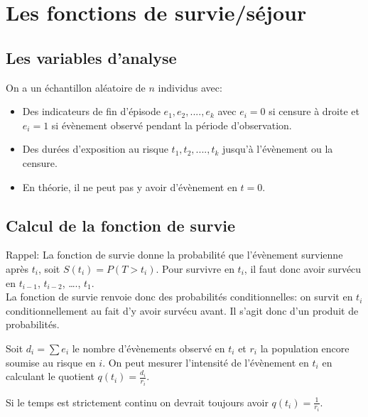 \documentclass[
  12pt,
  letterpaper,
  DIV=11,
  numbers=noendperiod,
  onepage,
  openany]{scrreprt}
\providecommand{\tightlist}{%
  \setlength{\itemsep}{0pt}\setlength{\parskip}{0pt}}\usepackage{longtable,booktabs,array}
\begin{document}
\hypertarget{les-fonctions-de-surviesuxe9jour}{%
\section{\texorpdfstring{\textbf{Les fonctions de
survie/séjour}}{Les fonctions de survie/séjour}}\label{les-fonctions-de-surviesuxe9jour}}

\hypertarget{les-variables-danalyse}{%
\subsection{Les variables d'analyse}\label{les-variables-danalyse}}

On a un échantillon aléatoire de \(n\) individus avec:

\begin{itemize}
\tightlist
\item
  Des indicateurs de fin d'épisode \(e_1,e_2,....,e_k\) avec \(e_i=0\)
  si censure à droite et \(e_i=1\) si évènement observé pendant la
  période d'observation.
\item
  Des durées d'exposition au risque \(t_1,t_2,....,t_k\) jusqu'à
  l'évènement ou la censure.
\item
  En théorie, il ne peut pas y avoir d'évènement en \(t=0\).
\end{itemize}

\hypertarget{calcul-de-la-fonction-de-survie}{%
\subsection{Calcul de la fonction de
survie}\label{calcul-de-la-fonction-de-survie}}

Rappel: La fonction de survie donne la probabilité que l'évènement
survienne après \(t_i\), soit \(S(t_i)=P(T>t_i)\). Pour survivre en
\(t_i\), il faut donc avoir survécu en \(t_{i-1}\), \(t_{i-2}\),
\ldots., \(t_{1}\).\\
La fonction de survie renvoie donc des probabilités conditionnelles: on
survit en \(t_i\) conditionnellement au fait d'y avoir survécu avant. Il
s'agit donc d'un produit de probabilités.

Soit \(d_i=\sum e_i\) le nombre d'évènements observé en \(t_i\) et
\(r_i\) la population encore soumise au risque en \(i\). On peut mesurer
l'intensité de l'évènement en \(t_i\) en calculant le quotient
\(q(t_i)=\frac{d_i}{r_i}\).

Si le temps est strictement continu on devrait toujours avoir
\(q(t_i)=\frac{1}{r_i}\).
\end{document}
